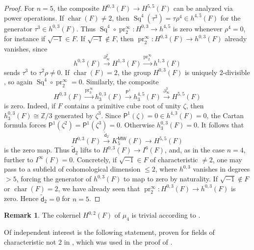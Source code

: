 \documentclass[11pt,hyp,english]{article}
\newcommand{\Z}{\mathbb{Z}}
\newcommand{\Sq}{\operatorname{Sq}}
\newcommand{\Char}{\operatorname{char}}
\newcommand{\pr}{\operatorname{pr}}
\newcommand{\MW}{{\mathsf{MW}}}
\newcommand{\vd}{{\tilde{\mathsf{d}}}}
\theoremstyle{definition}
\newtheorem{remark}[theorem]{Remark}
\begin{document}
\begin{proof}
For $n=5$, the composite $H^{0,3}(F)\to H^{5,5}(F)$ can be analyzed via power operations.  
If $\Char(F)\neq 2$, then $\Sq^4(\tau^3)=\tau\rho^4\in h^{4,5}(F)$ for the generator 
$\tau^3\in h^{0,3}(F)$.  
Thus 
$\Sq^4\circ \pr^\infty_2\colon H^{0,3}\to h^{4,5}$ is zero
whenever $\rho^4=0$, for instance if $\sqrt{-1}\in F$.  
If $\sqrt{-1}\notin F$, then $\pr^\infty_2\colon H^{0,3}(F)\to h^{0,3}(F)$ already vanishes, since 
\[
h^{0,3}(F)\xrightarrow{\partial^2_\infty} H^{1,3}(F)\xrightarrow{\pr^\infty_2} h^{1,3}(F)
\]
sends $\tau^3$ to $\tau^2\rho\neq 0$.  
If $\Char(F)=2$, the group $H^{0,3}(F)$ is uniquely $2$-divisible \cite{geisser-levine.ktheory}, so again $\Sq^4\circ \pr^\infty_2=0$.
Similarly, the composite
\[
H^{0,3}(F)\xrightarrow{\pr^\infty_3} h^{0,3}_3(F)\xrightarrow{\mathsf{P}^1} h^{4,5}_3(F)\xrightarrow{\partial^3_\infty} H^{5,5}(F)
\]
is zero.  Indeed, if $F$ contains a primitive cube root of unity $\zeta$, then $h^{0,3}_3(F)\cong\Z/3$ generated by $\zeta^3$.  
Since $\mathsf{P}^1(\zeta)=0\in h^{4,3}(F)=0$, the Cartan formula 
\cite[Proposition~9.7]{Voevodsky:power} forces $\mathsf{P}^1(\zeta^2)=\mathsf{P}^1(\zeta^3)=0$.  
Otherwise $h^{0,3}_3(F)=0$.  
It follows that 
\[
H^{0,3}(F)\xrightarrow{\vd_2} K^{\MW}_5(F) \to H^{5,5}(F)
\]
is the zero map.  Thus $\vd_2$ lifts to $H^{0,3}(F)\to I^6(F)$, and, as in the case $n=4$, further to $I^\infty(F)=0$.  
Concretely, if $\sqrt{-1}\in F$ of characteristic $\neq 2$, one may pass to a subfield of cohomological dimension $\leq 2$, where $h^{0,3}$ vanishes in degrees $>5$, forcing the generator of $h^{0,3}(F)$ to map to zero by naturality.  
If $\sqrt{-1}\notin F$ or $\Char(F)=2$, 
we have already seen that $\pr^\infty_2\colon H^{0,3}(F)\to h^{0,3}(F)$ is zero.  
Hence $\vd_2=0$ for $n=5$.


\end{proof}

\begin{remark}
\label{remark:vanishing}
The cokernel $H^{0,2}(F)$ of $\mu_4$ is trivial according to \cite[Remarks 3.3 (a)]{zbMATH06603527}.
\end{remark}

Of independent interest is the following statement, proven for fields of characteristic not $2$ in \cite[Theorem 3.30]{2020arXiv200506778B}, which was used in the proof of .
\end{document}
